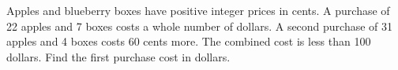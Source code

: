 Apples and blueberry boxes have positive integer prices in cents. A purchase of 22 apples and 7 boxes costs a whole number of dollars. A second purchase of 31 apples and 4 boxes costs 60 cents more. The combined cost is less than 100 dollars. Find the first purchase cost in dollars.
